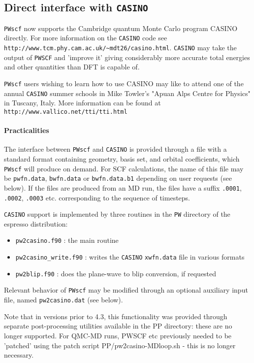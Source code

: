 \documentclass[12pt,a4paper]{article}
\begin{document}
\subsection{Direct interface with \texttt{CASINO}} \label{pw2casino_info}

\texttt{PWscf} now supports the Cambridge quantum Monte Carlo program CASINO directly. For more information
on the \texttt{CASINO} code see \texttt{http://www.tcm.phy.cam.ac.uk/\~{}mdt26/casino.html}. 
\texttt{CASINO} may take the output of \texttt{PWSCF} and
'improve it' giving considerably more accurate total energies and other
quantities than DFT is capable of.


\texttt{PWscf} users wishing to learn how to use CASINO may like to attend one
of the annual \texttt{CASINO} summer schools in Mike Towler's "Apuan Alps Centre
for Physics" in Tuscany, Italy. More information can be found at \texttt{http://www.vallico.net/tti/tti.html} 
\paragraph{Practicalities}
The interface between \texttt{PWscf} and \texttt{CASINO} is provided through a file with a
standard format containing geometry, basis set, and orbital coefficients, which
\texttt{PWscf} will produce on demand. For SCF calculations, the name of this file may
be \texttt{pwfn.data}, \texttt{bwfn.data} or \texttt{bwfn.data.b1} depending on user requests (see below).
If the files are produced from an MD run, the files have a suffix \texttt{.0001}, \texttt{.0002},
\texttt{.0003} etc.  corresponding to the sequence of timesteps.

\texttt{CASINO} support is implemented by three routines in the \texttt{PW} directory of the
espresso distribution: 
\begin{itemize}
\item \texttt{pw2casino.f90} : the main routine     
\item \texttt{pw2casino\_write.f90} : writes the \texttt{CASINO} \texttt{xwfn.data} file in various formats
\item \texttt{pw2blip.f90} : does the plane-wave to blip conversion, if requested
\end{itemize}
Relevant behavior of \texttt{PWscf} may be modified through an optional auxiliary input 
file, named \texttt{pw2casino.dat} (see below).

Note that in versions prior to 4.3, this functionality was provided through
separate post-processing utilities available in the PP directory: these are 
no longer supported. For QMC-MD runs, PWSCF etc previously needed to be 
'patched' using the patch script PP/pw2casino-MDloop.sh - this is no longer 
necessary.
\end{document}
